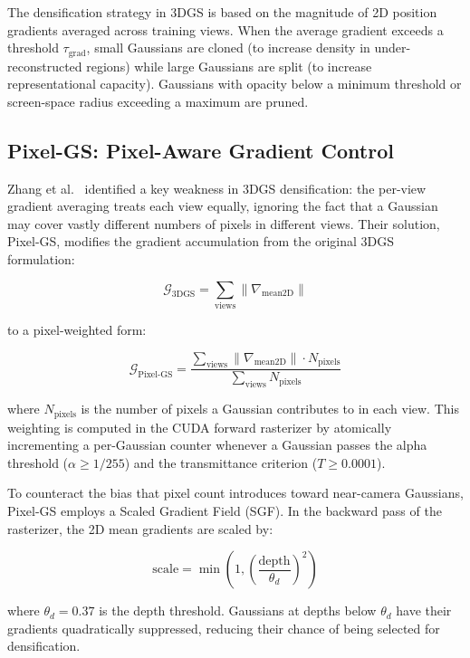 \documentclass[conference]{IEEEtran}
\begin{document}
The densification strategy in 3DGS is based on the magnitude of 2D position gradients averaged across training views. When the average gradient exceeds a threshold $\tau_\text{grad}$, small Gaussians are cloned (to increase density in under-reconstructed regions) while large Gaussians are split (to increase representational capacity). Gaussians with opacity below a minimum threshold or screen-space radius exceeding a maximum are pruned.

\subsection{Pixel-GS: Pixel-Aware Gradient Control}

Zhang et al.~\cite{zhang2024pixelgs} identified a key weakness in 3DGS densification: the per-view gradient averaging treats each view equally, ignoring the fact that a Gaussian may cover vastly different numbers of pixels in different views. Their solution, Pixel-GS, modifies the gradient accumulation from the original 3DGS formulation:

\begin{equation}
\mathcal{G}_{\text{3DGS}} = \sum_{\text{views}} \|\nabla_{\text{mean2D}}\|
\end{equation}

to a pixel-weighted form:

\begin{equation}
\mathcal{G}_{\text{Pixel-GS}} = \frac{\sum_{\text{views}} \|\nabla_{\text{mean2D}}\| \cdot N_{\text{pixels}}}{\sum_{\text{views}} N_{\text{pixels}}}
\end{equation}

where $N_{\text{pixels}}$ is the number of pixels a Gaussian contributes to in each view. This weighting is computed in the CUDA forward rasterizer by atomically incrementing a per-Gaussian counter whenever a Gaussian passes the alpha threshold ($\alpha \geq 1/255$) and the transmittance criterion ($T \geq 0.0001$).

To counteract the bias that pixel count introduces toward near-camera Gaussians, Pixel-GS employs a Scaled Gradient Field (SGF). In the backward pass of the rasterizer, the 2D mean gradients are scaled by:

\begin{equation}
\text{scale} = \min\left(1, \left(\frac{\text{depth}}{\theta_d}\right)^2\right)
\end{equation}

where $\theta_d = 0.37$ is the depth threshold. Gaussians at depths below $\theta_d$ have their gradients quadratically suppressed, reducing their chance of being selected for densification.
\end{document}
